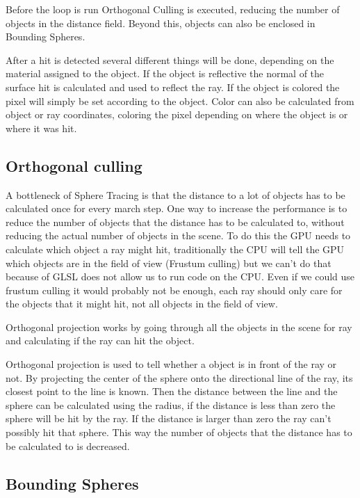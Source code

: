 			Before the loop is run Orthogonal Culling is executed, reducing the
			number of objects in the distance field. Beyond this, objects can also
			be enclosed in Bounding Spheres.
			
			After a hit is detected several different things will be done, 
			depending on the material assigned to the object. If the object is
			reflective the normal of the surface hit is calculated and used to
			reflect the ray. If the object is colored the pixel will simply be 
			set according to the object. Color can also be calculated from object 
			or ray coordinates, coloring the pixel depending on where the object is
			or where it was hit. 

		\subsection{Orthogonal culling}

			A bottleneck of Sphere Tracing is that the distance to
			a lot of objects has to be calculated once for every march step.
			One way to increase the performance is to reduce
			the number of objects that the distance has to be calculated to,
			without reducing the actual number of objects in the scene. To do
			this the GPU needs to calculate which object a ray might hit,
			traditionally the CPU will tell the GPU which objects are in the
			field of view (Frustum culling) but we can't do that because of
			GLSL does not allow us to run code on the CPU. Even if we could use frustum culling it would
			probably not be enough, each ray should only care for the objects
			that it might hit, not all objects in the field of view.

			Orthogonal projection works by going through all the objects in the 
			scene for ray and calculating if the ray can hit the object. 

			Orthogonal projection is used to tell whether a object is in front
			of the ray or not. By projecting the center of the sphere onto
			the directional line of the ray, its closest point to the line is
			known.  Then the distance between the line and the sphere can be
			calculated using the radius, if the distance is less than zero the
			sphere will be hit by the ray. If the distance is larger than zero
			the ray can't possibly hit that sphere. This way the number of
			objects that the distance has to be calculated to is decreased.

		\subsection{Bounding Spheres}
			
